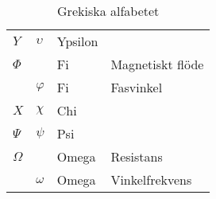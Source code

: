\begin{table*}
\begin{center}
\begin{tabular}{ll|l|l}
    \(Y\) & \(\upsilon\) & Ypsilon &  \\
    \(\Phi\) & & Fi & Magnetiskt flöde \\
    & \(\varphi\) & Fi & Fasvinkel \\
    \(X\) & \(\chi\) & Chi & \\
    \(\Psi\) & \(\psi\) & Psi & \\
    \(\Omega\) & & Omega & Resistans \\
    & \(\omega\) & Omega & Vinkelfrekvens \\
  \end{tabular}
  \caption{Grekiska alfabetet}
  \label{tab:a.grekiska}
  \end{center}
\end{table*}
